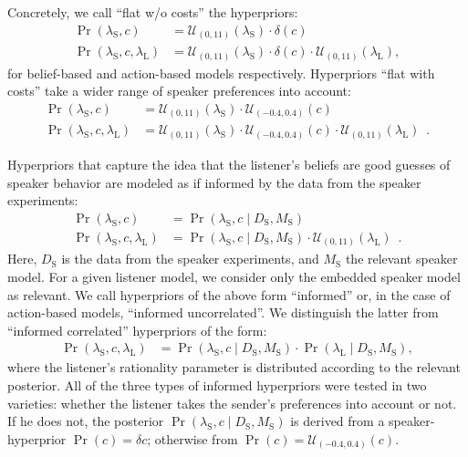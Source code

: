 Concretely, we call ``flat w/o costs'' the hyperpriors:
\begin{align*}
  \Pr(\lambda_\mathrm{S},c) & =
  \mathcal{U}_{(0,11)}(\lambda_\mathrm{S}) \cdot
  \delta(c) \\
  \Pr(\lambda_\mathrm{S},c,\lambda_\mathrm{L}) & = 
  \mathcal{U}_{(0,11)}(\lambda_\mathrm{S}) \cdot
    \delta(c) \cdot  \mathcal{U}_{(0,11)}(
    \lambda_\mathrm{L}),
\end{align*}
for belief-based and action-based models respectively. Hyperpriors
``flat with costs'' take a wider range of speaker preferences into
account: 
\begin{align*}
  \Pr(\lambda_\mathrm{S},c) & =
  \mathcal{U}_{(0,11)}(\lambda_\mathrm{S}) \cdot
  \mathcal{U}_{(-0.4,0.4)}(c) \\
  \Pr(\lambda_\mathrm{S},c,\lambda_\mathrm{L}) & = 
  \mathcal{U}_{(0,11)}(\lambda_\mathrm{S}) \cdot
    \mathcal{U}_{(-0.4,0.4)}(c) \cdot  \mathcal{U}_{(0,11)}(
    \lambda_\mathrm{L}) \enspace .
\end{align*}

Hyperpriors that capture the idea that the listener's beliefs are good
guesses of speaker behavior are modeled as if informed by the data
from the speaker experiments:
\begin{align*}
  \Pr(\lambda_\mathrm{S},c) & = \Pr(\lambda_\mathrm{S},c \mid D_\mathrm{S}, M_\mathrm{S}) \\
  \Pr(\lambda_\mathrm{S},c,\lambda_\mathrm{L}) & = 
   \Pr(\lambda_\mathrm{S},c \mid D_\mathrm{S}, M_\mathrm{S}) \cdot  \mathcal{U}_{(0,11)}(
    \lambda_\mathrm{L}) \enspace .
\end{align*}
Here, $D_\mathrm{S}$ is the data from the speaker experiments, and
$M_\mathrm{S}$ the relevant speaker model. For a given listener model,
we consider only the embedded speaker model as relevant. We call
hyperpriors of the above form ``informed'' or, in the case of
action-based models, ``informed uncorrelated''. We distinguish the
latter from ``informed correlated'' hyperpriors of the form:
\begin{align*}
  \Pr(\lambda_\mathrm{S},c,\lambda_\mathrm{L}) & = 
   \Pr(\lambda_\mathrm{S},c \mid D_\mathrm{S}, M_\mathrm{S}) \cdot \Pr(\lambda_\mathrm{L} \mid D_\mathrm{S}, M_\mathrm{S}),
\end{align*}
where the listener's rationality parameter is distributed according to
the relevant posterior. All of the three types of informed hyperpriors
were tested in two varieties: whether the listener takes the sender's
preferences into account or not. If he does not, the posterior
$\Pr(\lambda_\mathrm{S},c \mid D_\mathrm{S}, M_\mathrm{S})$ is derived
from a speaker-hyperprior $\Pr(c) = \delta{c}$; otherwise from $\Pr(c)
= \mathcal{U}_{(-0.4,0.4)}(c)$.

